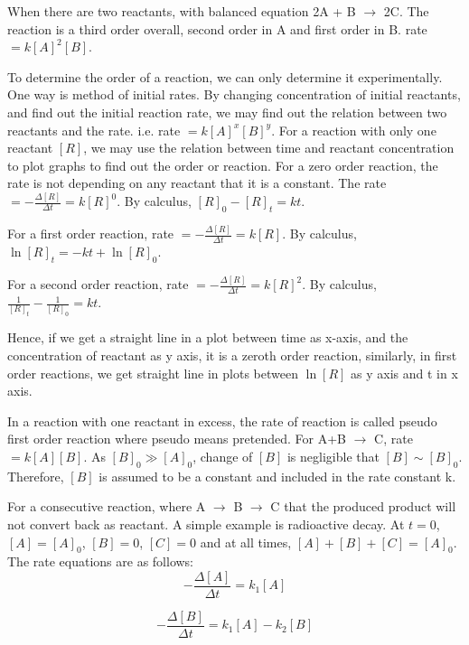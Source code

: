 When there are two reactants, with balanced equation 2A + B $\rightarrow$ 2C. The reaction is a third order overall, second order in A and first order in B. rate $ = k [A]^2 [B]$.

To determine the order of a reaction, we can only determine it experimentally. One way is method of initial rates. By changing concentration of initial reactants, and find out the initial reaction rate, we may find out the relation between two reactants and the rate. i.e. rate $ = k [A]^x [B]^y $.
For a reaction with only one reactant $[R]$, we may use the relation between time and reactant concentration to plot graphs to find out the order or reaction.
For a zero order reaction, the rate is not depending on any reactant that it is a constant. The rate $ = - \frac{\Delta [R]}{\Delta t} = k[R]^0$. By calculus, $[R]_0 - [R]_t = kt$.

For a first order reaction, rate $ = - \frac{\Delta [R]}{\Delta t} = k[R]$. By calculus, $\ln [R]_t = -kt + \ln [R]_0$.

For a second order reaction, rate $ = - \frac{\Delta [R]}{\Delta t} = k[R]^2$. By calculus, $\frac{1}{[R]_t} - \frac{1}{[R]_0} = kt$.

Hence, if we get a straight line in a plot between time as x-axis, and the concentration of reactant as y axis, it is a zeroth order reaction, similarly, in first order reactions, we get straight line in plots between $\ln [R]$ as y axis and t in x axis.

In a reaction with one reactant in excess, the rate of reaction is called pseudo first order reaction where pseudo means pretended. For A+B $\rightarrow$ C, rate $ = k[A][B]$. As $[B]_0 \gg [A]_0$, change of $[B]$ is negligible that $[B] \sim [B]_0$. Therefore, $[B]$ is assumed to be a constant and included in the rate constant k.

For a consecutive reaction, where A $\rightarrow$ B $\rightarrow$ C that the produced product will not convert back as reactant. A simple example is radioactive decay. At $t=0$, $[A]=[A]_0$, $[B]=0$, $[C]=0$ and at all times, $[A]+[B]+[C]=[A]_0$. The rate equations are as follows:
\begin{equation}
- \frac{\Delta [A]}{\Delta t} = k_1 [A]
\label{eq:rate1}
\end{equation}

\begin{equation}
- \frac{\Delta [B]}{\Delta t} = k_1 [A] - k_2 [B]
\label{eq:rate2}
\end{equation}

